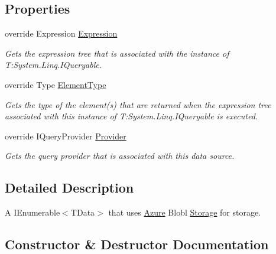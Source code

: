 \subsection*{Properties}
\begin{DoxyCompactItemize}
\item 
override Expression \hyperlink{classCqrs_1_1Azure_1_1BlobStorage_1_1BlobStorageStore_a8b3be7237234e7de532fccbfa6bbade8_a8b3be7237234e7de532fccbfa6bbade8}{Expression}
\begin{DoxyCompactList}\small\item\em Gets the expression tree that is associated with the instance of T\+:\+System.\+Linq.\+I\+Queryable. \end{DoxyCompactList}\item 
override Type \hyperlink{classCqrs_1_1Azure_1_1BlobStorage_1_1BlobStorageStore_af4f4ed2c32ce521ebf164e63ef453b9c_af4f4ed2c32ce521ebf164e63ef453b9c}{Element\+Type}
\begin{DoxyCompactList}\small\item\em Gets the type of the element(s) that are returned when the expression tree associated with this instance of T\+:\+System.\+Linq.\+I\+Queryable is executed. \end{DoxyCompactList}\item 
override I\+Query\+Provider \hyperlink{classCqrs_1_1Azure_1_1BlobStorage_1_1BlobStorageStore_acbc7f5a9d6eb9d1ece9a9035f185d4bf_acbc7f5a9d6eb9d1ece9a9035f185d4bf}{Provider}
\begin{DoxyCompactList}\small\item\em Gets the query provider that is associated with this data source. \end{DoxyCompactList}\end{DoxyCompactItemize}


\subsection{Detailed Description}
A I\+Enumerable$<$\+T\+Data$>$ that uses \hyperlink{namespaceCqrs_1_1Azure}{Azure} Blobl \hyperlink{namespaceCqrs_1_1Azure_1_1Storage}{Storage} for storage. 



\subsection{Constructor \& Destructor Documentation}
\mbox{\label{classCqrs_1_1Azure_1_1BlobStorage_1_1BlobStorageStore_ae1979c63b97dea8e207dda7b0087ee6b_ae1979c63b97dea8e207dda7b0087ee6b}} 
